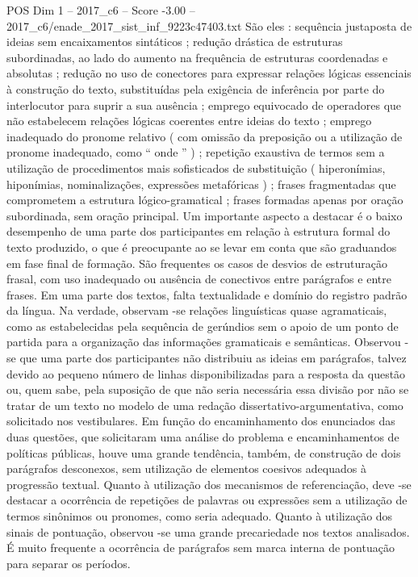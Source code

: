 \begin{textsample}{POS Dim 1 – 2017\_c6 – Score -3.00 – 2017\_c6/enade\_2017\_sist\_inf\_9223c47403.txt}
São eles : sequência justaposta de ideias sem encaixamentos sintáticos ; redução drástica de estruturas subordinadas, ao lado do aumento na frequência de estruturas coordenadas e absolutas ; redução no uso de conectores para expressar relações lógicas essenciais à construção do texto, substituídas pela exigência de inferência por parte do interlocutor para suprir a sua ausência ; emprego equivocado de operadores que não estabelecem relações lógicas coerentes entre ideias do texto ; emprego inadequado do pronome relativo ( com omissão da preposição ou a utilização de pronome inadequado, como “ onde ” ) ; repetição exaustiva de termos sem a utilização de procedimentos mais sofisticados de substituição ( hiperonímias, hiponímias, nominalizações, expressões metafóricas ) ; frases fragmentadas que comprometem a estrutura lógico-gramatical ; frases formadas apenas por oração subordinada, sem oração principal.
Um importante aspecto a destacar é o baixo desempenho de uma parte dos participantes em relação à estrutura formal do texto produzido, o que é preocupante ao se levar em conta que são graduandos em fase final de formação.
São frequentes os casos de desvios de estruturação frasal, com uso inadequado ou ausência de conectivos entre parágrafos e entre frases.
Em uma parte dos textos, falta textualidade e domínio do registro padrão da língua.
Na verdade, observam -se relações linguísticas quase agramaticais, como as estabelecidas pela sequência de gerúndios sem o apoio de um ponto de partida para a organização das informações gramaticais e semânticas.
Observou -se que uma parte dos participantes não distribuiu as ideias em parágrafos, talvez devido ao pequeno número de linhas disponibilizadas para a resposta da questão ou, quem sabe, pela suposição de que não seria necessária essa divisão por não se tratar de um texto no modelo de uma redação dissertativo-argumentativa, como solicitado nos vestibulares.
Em função do encaminhamento dos enunciados das duas questões, que solicitaram uma análise do problema e encaminhamentos de políticas públicas, houve uma grande tendência, também, de construção de dois parágrafos desconexos, sem utilização de elementos coesivos adequados à progressão textual.
Quanto à utilização dos mecanismos de referenciação, deve -se destacar a ocorrência de repetições de palavras ou expressões sem a utilização de termos sinônimos ou pronomes, como seria adequado.
Quanto à utilização dos sinais de pontuação, observou -se uma grande precariedade nos textos analisados.
É muito frequente a ocorrência de parágrafos sem marca interna de pontuação para separar os períodos.

\end{textsample}
